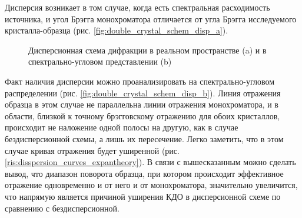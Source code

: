\label{sec:dispersion_cal_an_exp}
  Дисперсия возникает в том случае, когда есть спектральная расходимость источника, и
   угол Брэгга монохроматора отличается от угла Брэгга исследуемого кристалла-образца
   (рис. \ref{fig:double_crystal_schem_disp_a}).
  \begin{figure}[H]
    \centering
    \hfill
    \caption{Дисперсионная схема дифракции в реальном пространстве (a) и в спектрально-угловом представлении (b)}
    \label{ris:double_crystal_schem_disp}
  \end{figure}
  Факт наличия дисперсии можно проанализировать на спектрально-угловом распределении
  (рис. \ref{fig:double_crystal_schem_disp_b}). Линия отражения образца в этом случае
  не параллельна линии отражения монохроматора, и в области, близкой к точному брэгговскому
  отражению для обоих кристаллов, происходит не наложение одной полосы на другую,
  как в случае бездисперсионной схемы,
  а лишь их пересечение. Легко заметить, что в этом случае кривая отражения будет уширенной (рис. \ref{ris:disspersion_curves_expantheory}).
  В связи с вышесказанным можно сделать вывод, что диапазон поворота образца,
   при котором происходит эффективное отражение одновременно и от него и от монохроматора,
   значительно увеличится, что напрямую является причиной уширения КДО в дисперсионной схеме по сравнению
   с бездисперсионной.


